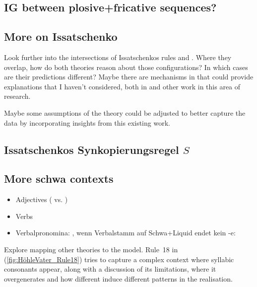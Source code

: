 

\subsection{IG between plosive+fricative sequences?}


\subsection{More on Issatschenko  \CVCV}
Look further into the intersections of Issatschenkos rules
and \CVCV. Where they overlap, how do both theories reason about those configurations?
In which cases are their predictions different?
Maybe there are mechanisms in \CVCV that could provide explanations that I haven't considered,
both in \cite{scheer2004} and other work in this area of research.

Maybe some assumptions of the theory could be adjusted to better capture the data
by incorporating insights from this existing work.



\subsection{Issatschenkos Synkopierungsregel $S$}


\subsection{More schwa contexts}
\begin{itemize}
\item Adjectives ( vs. )
\item Verbs
\item Verbalpronomina: ,
  wenn Verbalstamm auf Schwa+Liquid endet kein -e:
\end{itemize}


Explore mapping other theories to the \CVCV model.
Rule~18 in \cite[p.~176]{hohleVater1978} (\cref{fig:HöhleVater_Rule18})
tries to capture a complex context where syllabic consonants appear,
along with a discussion of its limitations,
where it overgenerates and how different  induce different
patterns in the  realisation.


